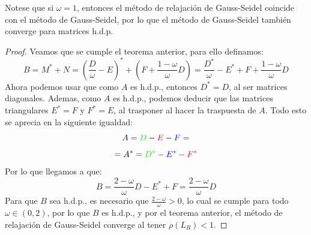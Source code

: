 \begin{observación}
    Notese que si $\omega = 1$, entonces el método de relajación de Gauss-Seidel coincide con el método de Gauss-Seidel, por lo que el método de Gauss-Seidel también converge para matrices h.d.p.
\end{observación}

\begin{proof}
    Veamos que se cumple el teorema anterior, para ello definamos:
    \[
        B = M^* + N =
        \left( \frac{D}{\omega} - E \right)^* + \left( F + \frac{1-\omega}{\omega} D \right) =
        \frac{D^*}{\omega} - E^* + F + \frac{1-\omega}{\omega} D
    \]
    Ahora podemos usar que como $A$ es h.d.p., entonces $D^* = D$, al ser matrices diagonales. Ademas, como $A$ es h.d.p., podemos deducir que las matrices triangulares $E^*=F$ y $F^* = E$, al trasponer al hacer la traspuesta de $A$. Todo esto se aprecia en la siguiente igualdad:
    \[
        A = \color{green} D \color{black} - \color{red} E \color{black} - \color{blue} F \color{black} =
        \]
        \[
        = A^* = \color{green} D^* \color{black} - \color{blue} E^* \color{black} - \color{red} F^*
    \]
    Por lo que llegamos a que:
    \[
        B =
        \frac{2 - \omega}{\omega} D  - E^* + F =
        \frac{2 - \omega}{\omega} D
    \]
    Para que $B$ sea h.d.p., es necesario que $\frac{2 - \omega}{\omega} > 0$, lo cual se cumple para todo $\omega \in (0,2)$, por lo que $B$ es h.d.p., y por el teorema anterior, el método de relajación de Gauss-Seidel converge al tener $\rho(L_R) < 1$.
\end{proof}